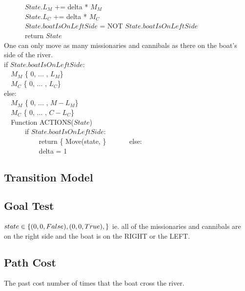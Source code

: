 \documentclass{article}
\begin{document}
\noindent    
\verb|      |$State.L_M$ += delta * $M_M$\\
\verb|      |$State.L_C$ += delta * $M_C$\\
\verb|      |$State.boatIsOnLeftSide$ = NOT $State.boatIsOnLeftSide$\\
\verb|      |return $State$\\
    
\noindent    
One can only move as many missionaries and cannibals as there on the boat's side of the river.\\
\hfill \break
\noindent  
\verb||if $State.boatIsOnLeftSide$:\\
\verb|  |$M_M$ \in \{ 0, ... ,  $L_M$\}\\
\verb|  |$M_C$ \in \{ 0, ... ,  $L_C$\}\\
\verb||else:\\
\verb|  |$M_M$ \in \{ 0, ... ,  $M-L_M$\}\\
\verb|  |$M_C$ \in \{ 0, ... ,  $C-L_C$\}\\

    

\verb|  |Function ACTIONS($State$)\\
\verb|      |if $State.boatIsOnLeftSide$:\\
\verb|          |return \{ Move(state, \} 
\verb|      |else:\\
\verb|          |delta = 1\\
    
    
    
\subsection{Transition Model}
\subsection{Goal Test}
    $state \in \{ (0,0, False), (0,0, True),\}\\ $
    ie. all of the missionaries and cannibals are on the right side and the boat is on the RIGHT or the LEFT.
    
\subsection{Path Cost}
    The past cost number of times that the boat cross the river.
    
\end{document}
